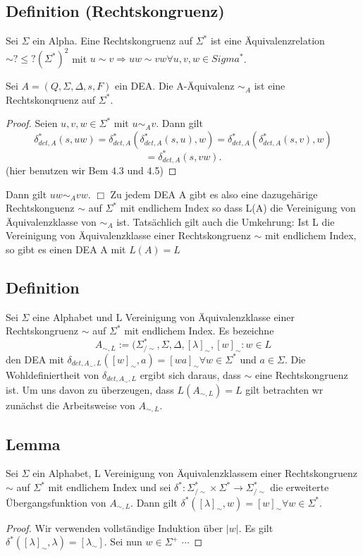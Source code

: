 \subsection{Definition (Rechtskongruenz)} Sei $\Sigma$ ein Alpha. Eine Rechtskongruenz auf $\Sigma^{*}$ ist eine Äquivalenzrelation $\sim ?\leq ?(\Sigma^{*})^{2}$ mit $u \sim v \Rightarrow uw \sim vw \forall u, v, w \in Sigma^{*}$.

\begin{proposition}
Sei $A = (Q, \Sigma, \Delta, s, F)$ ein DEA. Die A-Äquivalenz $\sim_{A}$ ist eine Rechtskonqruenz auf $\Sigma^{*}$.
\end{proposition}
\begin{proof}
  Seien $u, v, w \in \Sigma^{*}$ mit $u \sim_{A} v$. Dann gilt 
  \[\delta_{det, A}^{*}(s, uw) = \delta_{det,A}^{*}(\delta_{det,A}^{*}(s, u), w) = \delta_{det,A}^{*}(\delta_{det,A}^{*}(s,v), w)\]
  \[= \delta_{det,A}^{*}(s, vw).\] (hier benutzen wir Bem 4.3 und 4.5)    
\end{proof} Dann gilt $uw\sim_{A}vw.$
$\Box $
Zu jedem DEA A gibt es also eine dazugehärige Rechtskonguenz $\sim$ auf $\Sigma^{*}$ mit endlichem Index so dass L(A) die Vereinigung von Äquivalenzklasse von $\sim_{A}$ ist. Tatsächlich gilt auch die Umkehrung: Ist L die Vereinigung von Äquivalenzklasse einer Rechtskongruenz $\sim$ mit endlichem Index, so gibt es einen DEA A mit $L(A) = L$

\subsection{Definition} Sei $\Sigma$ eine Alphabet und L Vereinigung von Äquivalenzklasse einer Rechtskongruenz $\sim$ auf $\Sigma^{*}$ mit endlichem Index. Es bezeichne
\[A_{\sim , L} := (\Sigma^{*}_{/\sim}, \Sigma, \Delta, [\lambda]_{\sim}, {[w]_{\sim} : w \in L}\]
den DEA mit $\delta_{det, A_{\sim}, L}([w]_{\sim}, a) = [wa]_{\sim} \forall w \in \Sigma^{*}$ und $a \in \Sigma$. Die Wohldefiniertheit von $\delta_{det, A_{\sim}, L}$ ergibt sich daraus, dass $\sim$ eine Rechtskongruenz ist. Um uns davon zu überzeugen, dass $L(A_{\sim, L}) = L$ gilt betrachten wr zunächst die Arbeitsweise von $A_{\sim, L}$.

\subsection{Lemma} Sei $\Sigma$ ein Alphabet, L Vereinigung von Äquivalenzklassem einer Rechtskongruenz $\sim$ auf $\Sigma^{*}$ mit endlichem Index und sei $\delta^{*} : \Sigma^{*}_{/\sim} \times \Sigma^{*} \rightarrow \Sigma^{*}_{/\sim}$ die erweiterte Übergangsfunktion von $A_{\sim, L}$. Dann gilt $\delta^{*}([\lambda]_{\sim}, w) = [w]_{\sim} \forall w \in \Sigma^{*}$. 
\begin{proof}
  Wir verwenden vollständige Induktion über $|w|$. Es gilt $\delta^{*}([\lambda]_{\sim}, \lambda) = [\lambda_{\sim}]$. Sei nun $w \in \Sigma^{+}$ $\cdots$  
\end{proof}

